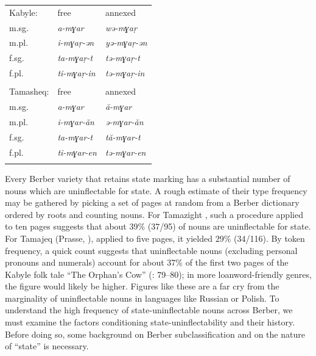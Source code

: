 \documentclass[output=paper]{langscibook}
\begin{document}
\begin{tabularx}{\textwidth}{XXX}

\lsptoprule

Kabyle: & free & annexed\\
m.sg. & \textit{a-mɣar} & \textit{wə-mɣaṛ}\\
m.pl. & \textit{i-mɣaṛ-ən} & \textit{yə-mɣaṛ-ən}\\
f.sg. & \textit{ta-mɣaṛ-t} & \textit{tə-mɣaṛ-t}\\
f.pl. & \textit{ti-mɣaṛ-in} & \textit{tə-mɣaṛ-in}\\
&  & \\
Tamasheq: & free & annexed\\
m.sg. & \textit{a-mɣar} & \textit{ă-mɣar}\\
m.pl. & \textit{i-mɣar-ăn} & \textit{ə-mɣar-ăn}\\
f.sg. & \textit{ta-mɣar-t} & \textit{tă-mɣar-t}\\
f.pl. & \textit{ti-mɣar-en} & \textit{tə-mɣar-en}\\
\lspbottomrule
\end{tabularx}
\begin{styleStandarduser}
Every Berber variety that retains state marking has a substantial number of nouns which are uninflectable for state. A rough estimate of their type frequency may be gathered by picking a set of pages at random from a Berber dictionary ordered by roots and counting nouns. For Tamazight \citep{Taïfi1991}, such a procedure applied to ten pages suggests that about 39\% (37/95) of nouns are uninflectable for state. For Tamajeq (Prasse, \citealt{AlojalyMohamed1998}), applied to five pages, it yielded 29\% (34/116). By token frequency, a quick count suggests that uninflectable nouns (excluding personal pronouns and numerals) account for about 37\% of the first two pages of the Kabyle folk tale “The Orphan’s Cow” (\citealt{Allioui2017}: 79–80); in more loanword-friendly genres, the figure would likely be higher. Figures like these are a far cry from the marginality of uninflectable nouns in languages like Russian or Polish. To understand the high frequency of state-uninflectable nouns across Berber, we must examine the factors conditioning state-uninflectability and their history. Before doing so, some background on Berber subclassification and on the nature of “state” is necessary.
\end{styleStandarduser}
\end{document}

